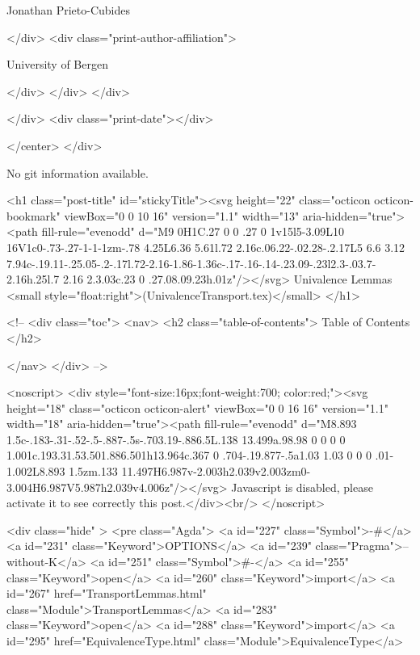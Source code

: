                   Jonathan Prieto-Cubides
                
              </div>
              <div class="print-author-affiliation">
                
                  University of Bergen
                
                </div>
            </div>
          </div>
          
          
        </div>
        <div class="print-date"></div>
        
        
    </center>
  </div>

  
  No git information available.
  

  <h1 class="post-title" id="stickyTitle"><svg height="22" class="octicon octicon-bookmark" viewBox="0 0 10 16" version="1.1" width="13" aria-hidden="true"><path fill-rule="evenodd" d="M9 0H1C.27 0 0 .27 0 1v15l5-3.09L10 16V1c0-.73-.27-1-1-1zm-.78 4.25L6.36 5.61l.72 2.16c.06.22-.02.28-.2.17L5 6.6 3.12 7.94c-.19.11-.25.05-.2-.17l.72-2.16-1.86-1.36c-.17-.16-.14-.23.09-.23l2.3-.03.7-2.16h.25l.7 2.16 2.3.03c.23 0 .27.08.09.23h.01z"/></svg> Univalence Lemmas <small style="float:right">(UnivalenceTransport.tex)</small>
  </h1>

  <!-- 
  <div class="toc">
    <nav>
    <h2 class="table-of-contents"> Table of Contents </h2>
      

    </nav>
  </div>
   -->

  <noscript>
  <div style="font-size:16px;font-weight:700; color:red;"><svg height="18" class="octicon octicon-alert" viewBox="0 0 16 16" version="1.1" width="18" aria-hidden="true"><path fill-rule="evenodd" d="M8.893 1.5c-.183-.31-.52-.5-.887-.5s-.703.19-.886.5L.138 13.499a.98.98 0 0 0 0 1.001c.193.31.53.501.886.501h13.964c.367 0 .704-.19.877-.5a1.03 1.03 0 0 0 .01-1.002L8.893 1.5zm.133 11.497H6.987v-2.003h2.039v2.003zm0-3.004H6.987V5.987h2.039v4.006z"/></svg> Javascript is disabled, please activate it to see correctly this post.</div><br/>
  </noscript>

  <div class="hide" >
<pre class="Agda">
<a id="227" class="Symbol">{-#</a> <a id="231" class="Keyword">OPTIONS</a> <a id="239" class="Pragma">--without-K</a> <a id="251" class="Symbol">#-}</a>
<a id="255" class="Keyword">open</a> <a id="260" class="Keyword">import</a> <a id="267" href="TransportLemmas.html" class="Module">TransportLemmas</a>
<a id="283" class="Keyword">open</a> <a id="288" class="Keyword">import</a> <a id="295" href="EquivalenceType.html" class="Module">EquivalenceType</a>

